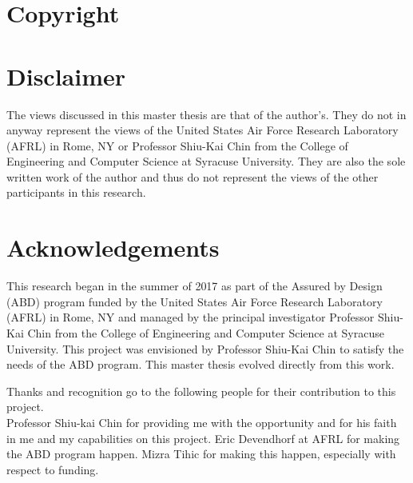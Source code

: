 \documentclass[../main/main.tex]{subfiles}
\begin{document}
\section*{Copyright}
\cleardoublepage

\section*{Disclaimer}
The views discussed in this master thesis are that of the author's.  They do not in anyway represent the views of the United States Air Force Research Laboratory (AFRL) in Rome, NY or  Professor Shiu-Kai Chin from the College of Engineering and Computer Science at Syracuse University.  They are also the sole written work of the author and thus do not represent the views of the other participants in this research.

\cleardoublepage

\section*{Acknowledgements}
This research began in the summer of 2017 as part of the Assured by Design (ABD) program funded by the United States Air Force Research Laboratory (AFRL) in Rome, NY and managed by the principal investigator Professor Shiu-Kai Chin from the College of Engineering and Computer Science at Syracuse University.  This project was envisioned by Professor Shiu-Kai Chin to satisfy the needs of the ABD program.  This master thesis evolved directly from this work.

Thanks and recognition go to the following people for their contribution to this project.\\
Professor Shiu-kai Chin for providing me with the opportunity and for his faith in me and my capabilities on this project.  Eric Devendhorf at AFRL for making the ABD program happen. Mizra Tihic for making this happen, especially with respect to funding.
\end{document}
